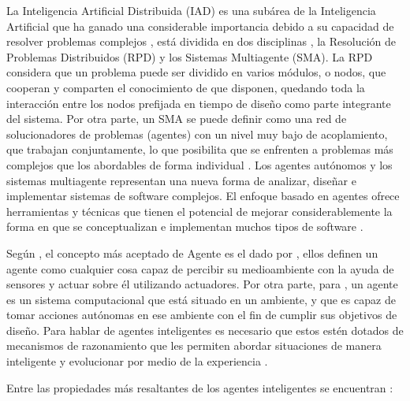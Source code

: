 La Inteligencia Artificial Distribuida (IAD) es una subárea de la Inteligencia
Artificial que ha ganado una considerable importancia debido a su capacidad de
resolver problemas complejos \citep{balaji2010}, está dividida en dos
disciplinas \citep{bond1989}, la Resolución de Problemas Distribuidos (RPD)
y los Sistemas Multiagente (SMA). La RPD considera que un problema puede ser
dividido en varios módulos, o nodos, que cooperan y comparten el conocimiento de
que disponen, quedando toda la interacción entre los nodos prefijada en tiempo
de diseño como parte integrante del sistema. Por otra parte, un SMA se puede
definir como una red de solucionadores de problemas (agentes) con un nivel muy
bajo de acoplamiento, que trabajan conjuntamente, lo que posibilita que se
enfrenten a problemas más complejos que los abordables de forma individual
\citep{perozo2011}. Los agentes autónomos y los sistemas multiagente representan una
nueva forma de analizar, diseñar e implementar sistemas de software complejos.
El enfoque basado en agentes ofrece herramientas y técnicas que tienen el
potencial de mejorar considerablemente la forma en que se conceptualizan e
implementan muchos tipos de software \citep{jennings1998}.

Según \cite{balaji2010}, el concepto más aceptado de Agente es el dado
por \cite{russell2004}, ellos definen un agente como cualquier cosa capaz
de percibir su medioambiente con la ayuda de sensores y actuar sobre él
utilizando actuadores. Por otra parte, para \cite{weiss1999}, un agente es un
sistema computacional que está situado en un ambiente, y que es capaz de tomar
acciones autónomas en ese ambiente con el fin de cumplir sus objetivos de
diseño. Para hablar de agentes inteligentes es necesario que estos estén dotados
de mecanismos de razonamiento que les permiten abordar situaciones de manera
inteligente y evolucionar por medio de la experiencia \citep{perozo2011}.

Entre las propiedades más resaltantes de los agentes inteligentes se encuentran \citep{perozo2011}:

